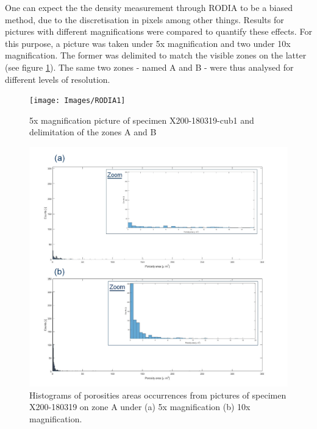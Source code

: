 One can expect the the density measurement through RODIA to be a biased method, due to the discretisation in pixels among other things. Results for pictures with different magnifications were compared to quantify these effects. For this purpose, a picture was taken under 5x magnification and two under 10x magnification. The former was delimited to match the visible zones on the latter (see figure \ref{fig:RODIA1}). The same two zones - named A and B - were thus analysed for different levels of resolution.\\

\begin{figure}[ht]
	\centering
	\centerline{\texttt{[image: Images/RODIA1]}}
	\decoRule
	\caption[5x magnification picture of specimen X200-180319-cub1 and delimitation of the zones A and B]{5x magnification picture of specimen X200-180319-cub1 and delimitation of the zones A and B}
	\label{fig:RODIA1}
\end{figure}

\begin{figure}[ht]
	\centering
	\centerline{\includegraphics[scale=0.43]{Images/RODIAHist}}
	\decoRule
	\caption[Histograms of porosities areas occurrences from pictures of specimen X200-180319 on zone A under (a) 5x magnification (b) 10x magnification]{Histograms of porosities areas occurrences from pictures of specimen X200-180319 on zone A under (a) 5x magnification (b) 10x magnification. }
	\label{fig:RODIAH}
\end{figure}


